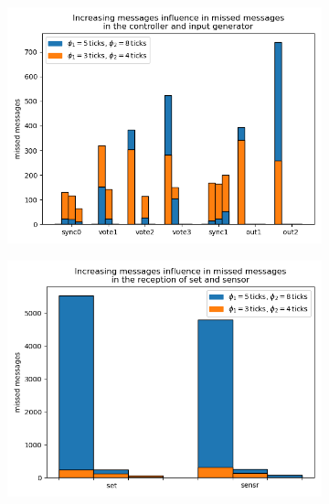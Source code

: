 \documentclass[table,xcdraw]{article}
\begin{document}
\begin{figure}[h!]
     \centering
     \begin{subfigure}[b]{0.8\textwidth}
         \centering
         \includegraphics[width=\textwidth]{figures/missing_msgs/missed_msgs_IncrMsgs_ctrl.png}
         \caption{}
     \end{subfigure}
     \hfill
     \begin{subfigure}[b]{0.4\textwidth}
         \centering
         \includegraphics[width=\textwidth]{figures/missing_msgs/missed_msgs_IncrMsgs_set_sensr.png}
         \caption{}
     \end{subfigure}
     \hfill
     \begin{subfigure}[b]{0.4\textwidth}

\end{subfigure}
\end{figure}
\end{document}
